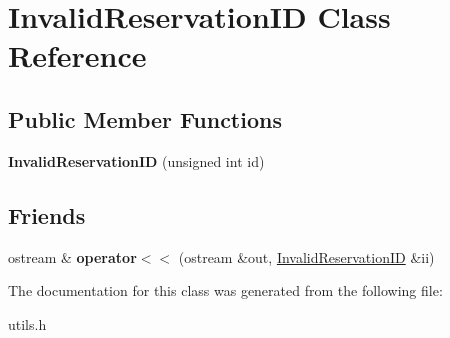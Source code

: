 \hypertarget{class_invalid_reservation_i_d}{}\section{Invalid\+Reservation\+ID Class Reference}
\label{class_invalid_reservation_i_d}
\subsection*{Public Member Functions}
\begin{DoxyCompactItemize}
\item 
\hypertarget{class_invalid_reservation_i_d_a7515283bffcb85f4d7dca12dd8ef5b85}{}\label{class_invalid_reservation_i_d_a7515283bffcb85f4d7dca12dd8ef5b85} 
{\bfseries Invalid\+Reservation\+ID} (unsigned int id)
\end{DoxyCompactItemize}
\subsection*{Friends}
\begin{DoxyCompactItemize}
\item 
\hypertarget{class_invalid_reservation_i_d_a37112c7064f2db8b764ba7f0b9b04ded}{}\label{class_invalid_reservation_i_d_a37112c7064f2db8b764ba7f0b9b04ded} 
ostream \& {\bfseries operator$<$$<$} (ostream \&out, \hyperlink{class_invalid_reservation_i_d}{Invalid\+Reservation\+ID} \&ii)
\end{DoxyCompactItemize}


The documentation for this class was generated from the following file\+:\begin{DoxyCompactItemize}
\item 
utils.\+h\end{DoxyCompactItemize}
